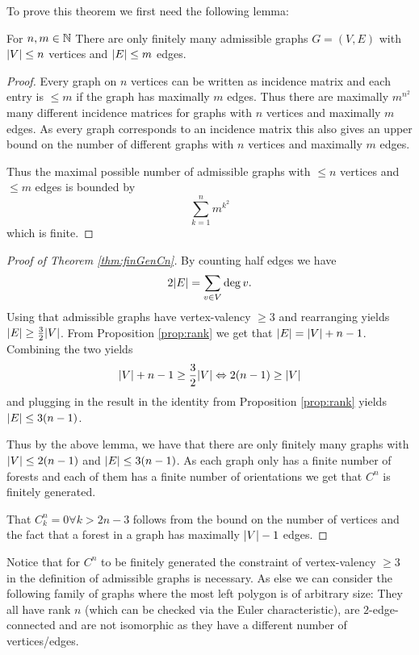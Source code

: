 To prove this theorem we first need the following lemma:
\begin{lemma}
	For $n,m \in \mathbb{N}$ There are only finitely many admissible graphs $G = (V,E)$ with $\abs{V} \leq n$ vertices and $ \abs{E} \leq m$ edges.
\end{lemma}

\begin{proof}
	Every graph on $n$ vertices can be written as incidence matrix and each entry is $\leq m$ if the graph has maximally $m$ edges. 
	Thus there are maximally $m^{n^2}$ many different incidence matrices for graphs with  $n$ vertices and maximally $m$ edges.
	As every graph corresponds to an incidence matrix this also gives an upper bound on the number of different graphs with $n$ vertices
	and maximally $m$ edges.

	Thus the maximal possible number of admissible graphs with $\leq n$ vertices and $\leq m$ edges is bounded by
	\[
		\sum_{k=1}^{n} m^{k^2} 
	\]
	which is finite.
\end{proof}

\begin{proof}[Proof of Theorem \ref{thm:finGenCn}]
	By counting half edges we have
	\[
		2 \abs{E} = \sum_{v \in V} \deg{v}
	.\] 
	Using that admissible graphs have vertex-valency $\geq 3$ and rearranging yields $\abs{E} \geq \frac{3}{2} \abs{V}$.
	From Proposition \ref{prop:rank} we get that $\abs{E} = \abs{V} + n-1$.
	Combining the two yields
	\[
		\abs{V} + n -1 \geq \frac{3}{2} \abs{V} \Leftrightarrow 2 (n-1) \geq \abs{V}
	\] 
	and plugging in the result in the identity from Proposition \ref{prop:rank} yields $\abs{E} \leq 3 (n-1)$.

	Thus by the above lemma, we have that there are only finitely many graphs with $\abs{V} \leq 2 (n-1)$ and $\abs{E} \leq 3(n-1)$.
	As each graph only has a finite number of forests and each of them has a finite number of orientations we get that
	$C^{n}$ is finitely generated.

	That $C_{k}^{n} = 0 \forall k > 2n -3$ follows from the bound on the number of vertices and the fact that a forest in a graph has maximally $\abs{V} - 1$ edges.
\end{proof}

\begin{remark}
	Notice that for $C^{n}$ to be finitely generated the constraint of vertex-valency $\geq 3$ in the definition of admissible graphs is necessary.
	As else we can consider the following family of graphs where the most left polygon is of arbitrary size:
	They all have rank $n$ (which can be checked via the Euler characteristic), are $2$-edge-connected and are not isomorphic as they have a different number of vertices/edges.
\end{remark}

